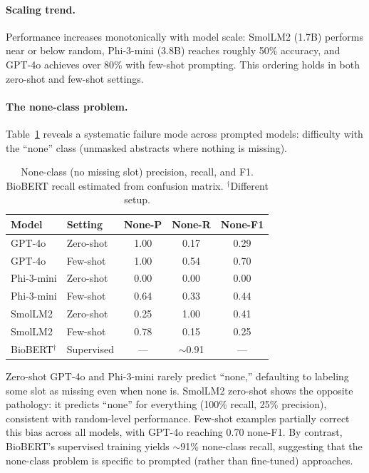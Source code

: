 \documentclass[11pt]{article}
\begin{document}
\paragraph{Scaling trend.}
Performance increases monotonically with model scale: SmolLM2 (1.7B) performs near or below random, Phi-3-mini (3.8B) reaches roughly 50\% accuracy, and GPT-4o achieves over 80\% with few-shot prompting.
This ordering holds in both zero-shot and few-shot settings.

\paragraph{The none-class problem.}
Table~\ref{tab:none} reveals a systematic failure mode across prompted models: difficulty with the ``none'' class (unmasked abstracts where nothing is missing).

\begin{table}[h]
\centering
\small
\begin{tabular}{llccc}
\toprule
\textbf{Model} & \textbf{Setting} & \textbf{None-P} & \textbf{None-R} & \textbf{None-F1} \\
\midrule
GPT-4o     & Zero-shot & 1.00 & 0.17 & 0.29 \\
GPT-4o     & Few-shot  & 1.00 & 0.54 & 0.70 \\
Phi-3-mini & Zero-shot & 0.00 & 0.00 & 0.00 \\
Phi-3-mini & Few-shot  & 0.64 & 0.33 & 0.44 \\
SmolLM2    & Zero-shot & 0.25 & 1.00 & 0.41 \\
SmolLM2    & Few-shot  & 0.78 & 0.15 & 0.25 \\
\midrule
BioBERT$^\dagger$ & Supervised & --- & $\sim$0.91 & --- \\
\bottomrule
\end{tabular}
\caption{None-class (no missing slot) precision, recall, and F1. BioBERT recall estimated from confusion matrix. $^\dagger$Different setup.}
\label{tab:none}
\end{table}

Zero-shot GPT-4o and Phi-3-mini rarely predict ``none,'' defaulting to labeling some slot as missing even when none is.
SmolLM2 zero-shot shows the opposite pathology: it predicts ``none'' for everything (100\% recall, 25\% precision), consistent with random-level performance.
Few-shot examples partially correct this bias across all models, with GPT-4o reaching 0.70 none-F1.
By contrast, BioBERT's supervised training yields $\sim$91\% none-class recall, suggesting that the none-class problem is specific to prompted (rather than fine-tuned) approaches.
\end{document}
